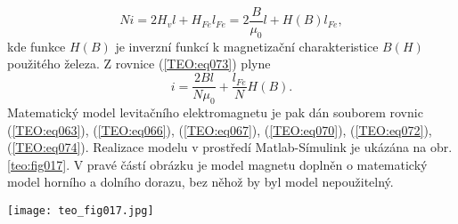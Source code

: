       \begin{equation}\label{TEO:eq073}
      Ni = 2H_vl+H_{Fe}l_{Fe} = 2\frac{B}{\mu_0}l + H(B)l_{Fe},
      \end{equation}
      kde funkce \(H(B)\) je inverzní funkcí k magnetizační charakteristice \(B(H)\) použitého 
      železa. Z rovnice (\ref{TEO:eq073}) plyne
      \begin{equation}\label{TEO:eq074}
        i = \frac{2Bl}{N\mu_0} + \frac{l_{Fe}}{N}H(B).
      \end{equation}
      Matematický model levitačního elektromagnetu je pak dán souborem rovnic (\ref{TEO:eq063}), 
      (\ref{TEO:eq066}), (\ref{TEO:eq067}), (\ref{TEO:eq070}), (\ref{TEO:eq072}), 
      (\ref{TEO:eq074}). Realizace modelu v prostředí Matlab-Símulink je ukázána na obr. 
      \ref{teo:fig017}. V pravé částí obrázku je model magnetu doplněn o matematický model horního 
      a dolního dorazu, bez něhož by byl model nepoužitelný.
      
      \begin{figure*}[ht!] %
        \centering
        \texttt{[image: teo\_fig017.jpg]}
        \caption{Matematický model levitačního elektromagnetu v prostředí Matlab-Simulink.
                 (\cite[s.~168]{Patocka4})}
        \label{teo:fig017}
      \end{figure*}

